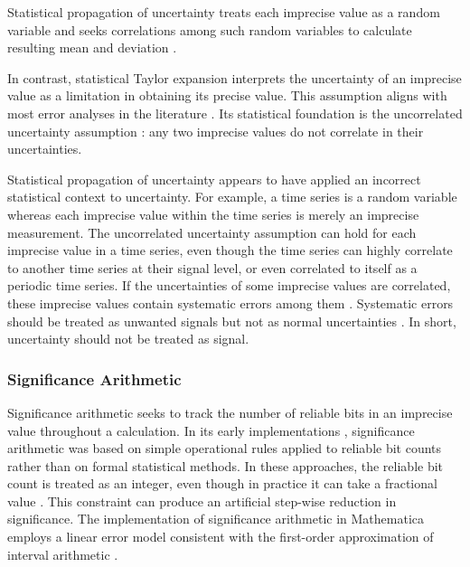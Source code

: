 \documentclass[twoside]{article}
\numberwithin{equation}{section}
\begin{document}
Statistical propagation of uncertainty treats each imprecise value as a random variable and seeks correlations among such random variables to calculate resulting mean and deviation \cite{Statistical_Arithmetic}.

In contrast, statistical Taylor expansion interprets the uncertainty of an imprecise value as a limitation in obtaining its precise value. 
This assumption aligns with most error analyses in the literature \cite{Statistical_Methods}\cite{Precisions_Physical_Measurements}.
Its statistical foundation is the uncorrelated uncertainty assumption \cite{Prev_Precision_Arithmetic}: any two imprecise values do not correlate in their uncertainties.

Statistical propagation of uncertainty appears to have applied an incorrect statistical context to uncertainty.
For example, a time series is a random variable whereas each imprecise value within the time series is merely an imprecise measurement.
The uncorrelated uncertainty assumption can hold for each imprecise value in a time series, even though the time series can highly correlate to another time series at their signal level, or even correlated to itself as a periodic time series.
If the uncertainties of some imprecise values are correlated, these imprecise values contain systematic errors among them \cite{Statistical_Methods}.
Systematic errors should be treated as unwanted signals but not as normal uncertainties \cite{Statistical_Methods}.
In short, uncertainty should not be treated as signal.



\subsubsection{Significance Arithmetic}

Significance arithmetic \cite{Significance_Arithmetic} seeks to track the number of reliable bits in an imprecise value throughout a calculation.  
In its early implementations \cite{Digital_Significance_Arithmetic}\cite{Unnormalized_Arithmetic}, significance arithmetic was based on simple operational rules applied to reliable bit counts rather than on formal statistical methods. 
In these approaches, the reliable bit count is treated as an integer, even though in practice it can take a fractional value \cite{Mathematica_Significance_Arithmetic}.
This constraint can produce an artificial step-wise reduction in significance.  
The implementation of significance arithmetic in Mathematica \cite{Mathematica_Significance_Arithmetic} employs a linear error model consistent with the first-order approximation of interval arithmetic \cite{Precise_Numerical_Methods}\cite{Interval_Analysis_Theory_Applications}\cite{Interval_Arithmetic}. 
\end{document}
